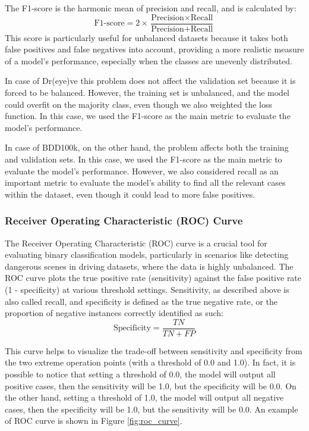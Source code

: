 The F1-score is the harmonic mean of precision and recall, and is calculated by:
\begin{equation*}
    \text{F1-score} = 2 \times \frac{\text{Precision} \times \text{Recall}}{\text{Precision} + \text{Recall}}
\end{equation*}
This score is particularly useful for unbalanced datasets because it takes both 
false positives and false negatives into account, providing a more realistic 
measure of a model’s performance, especially when the classes are unevenly 
distributed.

In case of Dr(eye)ve this problem does not affect the validation set because it 
is forced to be balanced. However, the training set is unbalanced, and the model 
could overfit on the majority class, even though we also weighted the loss 
function. In this case, we used the F1-score as the main metric to evaluate the 
model's performance.

In case of BDD100k, on the other hand, the problem affects both the training 
and validation sets. In this case, we used the F1-score as the main metric to 
evaluate the model's performance. However, we also considered recall as an 
important metric to evaluate the model's ability to find all the relevant cases 
within the dataset, even though it could lead to more false positives.

\subsubsection{Receiver Operating Characteristic (ROC) Curve}
The Receiver Operating Characteristic (ROC) curve is a crucial tool for 
evaluating binary classification models, particularly in scenarios like detecting 
dangerous scenes in driving datasets, where the data is highly unbalanced. 
The ROC curve plots the true positive rate (sensitivity) against the false positive 
rate (1 - specificity) at various threshold settings. 
Sensitivity, as described above is also called recall, and specificity is 
defined as the true negative rate, or the proportion of negative instances 
correctly identified as such:
\begin{equation*}
    \text{Specificity} = \frac{TN}{TN + FP}
\end{equation*}

This curve helps to 
visualize the trade-off between sensitivity and specificity from the two extreme 
operation points (with a threshold of 0.0 and 1.0).
In fact, it is possible to notice that setting a threshold of 0.0, the model 
will output all positive cases, then the sensitivity will be 1.0, but the 
specificity will be 0.0. On the other hand, setting a threshold of 1.0, the model 
will output all negative cases, then the specificity will be 1.0, but the 
sensitivity will be 0.0. An example of ROC curve is shown in Figure 
\ref{fig:roc_curve}.

